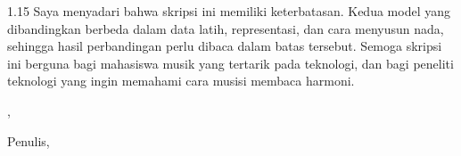 \begin{spacing}{1.15}
Saya menyadari bahwa skripsi ini memiliki keterbatasan. Kedua model yang dibandingkan berbeda dalam data latih, representasi, dan cara menyusun nada, sehingga hasil perbandingan perlu dibaca dalam batas tersebut. Semoga skripsi ini berguna bagi mahasiswa musik yang tertarik pada teknologi, dan bagi peneliti teknologi yang ingin memahami cara musisi membaca harmoni.\par

\vspace{0.5cm}
\begin{flushright}
    \begin{minipage}{0.45\textwidth}
        \centering
        \cityname, \makebox[3cm]{\dotfill}\par
        Penulis,\par
        \vspace{1.5cm}
        \researchername
    \end{minipage}
\end{flushright}
\end{spacing}

